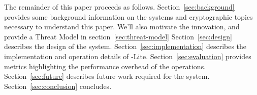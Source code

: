 
The remainder of this paper proceeds as follows.
%
Section~\ref{sec:background} provides some background information on the systems and cryptographic topics necessary to understand this paper. We'll also motivate the innovation, and provide a Threat Model in section~\ref{sec:threat-model}
%
Section~\ref{sec:design} describes the design of the \SystemName system.
%
Section~\ref{sec:implementation} describes the implementation and operation details of \SystemName-Lite.
%
Section~\ref{sec:evaluation} provides metrics highlighting the performance overhead of the \SystemName operations.
%
Section~\ref{sec:future} describes future work required for the \SystemName system.
%
Section~\ref{sec:conclusion} concludes.

